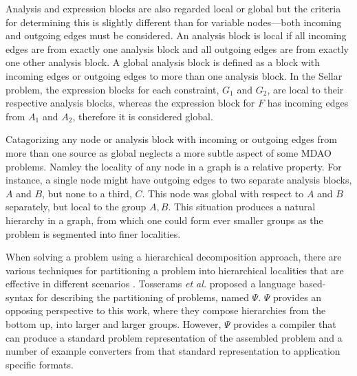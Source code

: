   Analysis and expression blocks are also regarded local or global but the 
  criteria for determining this is slightly different than for variable nodes---both incoming and outgoing edges must be considered.
  An analysis block is local if all incoming edges are from exactly one analysis 
  block and all outgoing edges are from exactly one other analysis block. A global 
  analysis block is defined as a block with incoming edges or outgoing edges 
  to more than one analysis block.   In the Sellar problem, the expression blocks for each constraint, 
  $G_1$ and $G_2$, are local to their respective analysis 
  blocks, whereas the expression block for $F$ has incoming edges from $A_1$ and 
  $A_2$, therefore it is considered global. 

  Catagorizing any node or analysis block with incoming or outgoing edges
  from more than one source as global neglects a more 
  subtle aspect of some MDAO problems. Namley the locality of any node in a graph is 
  a relative property. For instance, a single node might have outgoing edges 
  to two separate analysis blocks, $A$ and $B$, but none to a third, $C$. This 
  node was global with respect to $A$ and $B$ separately, but local 
  to the group $A,B$. This situation produces a natural hierarchy in a graph, 
  from which one could form ever smaller groups as the problem is segmented into 
  finer localities.

  When solving a problem using a hierarchical decomposition approach, 
  there are various techniques for partitioning a problem into hierarchical 
  localities that are effective in different scenarios 
  \cite{krishnamachari1997optimal,michelena1997hypergraph,sobieszczanski1997,Perez2004,allison2009optimal}. 
  Tosserams \textit{et al.} proposed a language based-syntax for describing the 
  partitioning of problems, named $\Psi$\cite{tosserams2010specification}. 
  $\Psi$ provides an opposing perspective to this work, where they compose 
  hierarchies from the bottom up, into larger and larger groups. However, 
  $\Psi$ provides a compiler that can produce a standard problem representation 
  of the assembled problem and a number of example converters from that 
  standard representation to application specific formats. 

